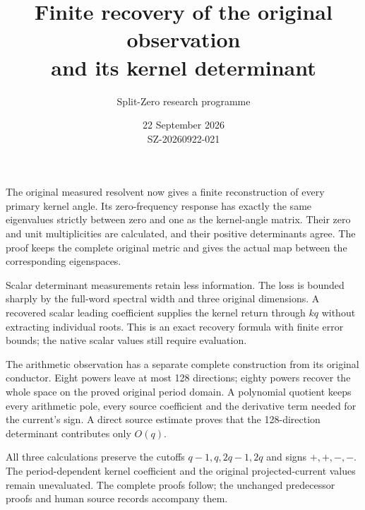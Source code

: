\documentclass[11pt]{article}
\title{Finite recovery of the original observation\\and its kernel determinant}
\author{Split-Zero research programme}
\date{22 September 2026\\SZ-20260922-021}
\begin{document}
\maketitle
The original measured resolvent now gives a finite reconstruction of every
primary kernel angle. Its zero-frequency response has exactly the same
eigenvalues strictly between zero and one as the kernel-angle matrix.
Their zero and unit multiplicities are calculated, and their positive
determinants agree. The proof keeps the complete original metric and gives
the actual map between the corresponding eigenspaces.

Scalar determinant measurements retain less information. The loss is
bounded sharply by the full-word spectral width and three original
dimensions. A recovered scalar leading coefficient supplies the kernel
return through $kq$ without extracting individual roots. This is an exact
recovery formula with finite error bounds; the native scalar values still
require evaluation.

The arithmetic observation has a separate complete construction from its
original conductor. Eight powers leave at most 128 directions; eighty powers
recover the whole space on the proved original period domain. A polynomial
quotient keeps every arithmetic pole, every source coefficient and the
derivative term needed for the current's sign. A direct source estimate
proves that the 128-direction determinant contributes only $O(q)$.

All three calculations preserve the cutoffs $q-1,q,2q-1,2q$ and signs
$+,+,-,-$. The period-dependent kernel coefficient and the original
projected-current values remain unevaluated. The complete proofs follow;
the unchanged predecessor proofs and human source records accompany them.
\begingroup\small\tableofcontents\endgroup\clearpage
\end{document}
